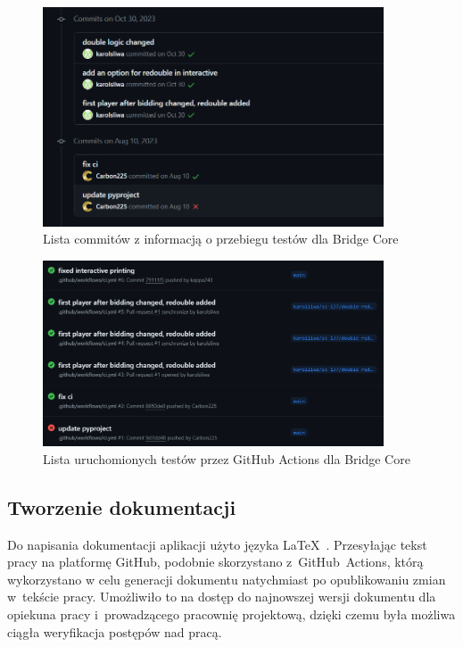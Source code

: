 \begin{figure}[hbt!]
  \centering
  \includegraphics[width=0.9\textwidth]{img/github/github-commits.png}
  \caption{Lista commitów z informacją o przebiegu testów dla Bridge Core}
  \label{fig:github-commits}
\end{figure}

\begin{figure}[hbt!]
  \centering
  \includegraphics[width=0.9\textwidth]{img/github/github-tests.png}
  \caption{Lista uruchomionych testów przez GitHub Actions dla Bridge Core}
  \label{fig:github-tests}
\end{figure}


\subsection{Tworzenie dokumentacji}

Do napisania dokumentacji aplikacji użyto języka \LaTeX~\cite{Latex}.
Przesyłając tekst pracy na platformę GitHub, podobnie skorzystano
\mbox{z GitHub Actions}, którą wykorzystano w celu
generacji dokumentu natychmiast po opublikowaniu zmian w~tekście pracy.
Umożliwiło to na dostęp do najnowszej wersji dokumentu dla opiekuna
pracy i~prowadzącego pracownię projektową, dzięki czemu była możliwa
ciągła weryfikacja postępów nad pracą.

